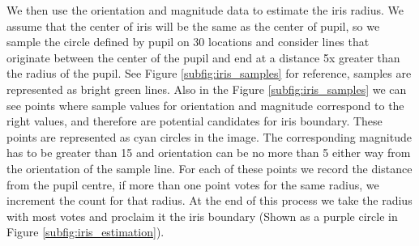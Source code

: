 We then use the orientation and magnitude data to estimate the iris radius. We assume that the center of iris will be the same as the center of pupil, so we sample the circle defined by pupil on 30 locations and consider lines that originate between the center of the pupil and end at a distance 5x greater than the radius of the pupil. See Figure \ref{subfig:iris_samples} for reference, samples are represented as bright green lines. Also in the Figure \ref{subfig:iris_samples} we can see points where sample values for orientation and magnitude correspond to the right values, and therefore are potential candidates for iris boundary. These points are represented as cyan circles in the image. The corresponding magnitude has to be greater than 15 and orientation can be no more than  5 either way from the orientation of the sample line. For each of these points we record the distance from the pupil centre, if more than one point votes for the same radius, we increment the count for that radius. At the end of this process we take the radius with most votes and proclaim it the iris boundary (Shown as a purple circle in Figure \ref{subfig:iris_estimation}).

